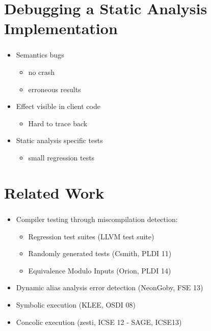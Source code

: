 \documentclass[mathserif,10pt]{beamer}
\begin{document}
\section{Debugging a Static Analysis Implementation}
\frame
{
  \frametitle{\secname}
  \begin{itemize} [<+->]
    \item Semantics bugs
    \begin{itemize}
      \item no crash
      \item erroneous results
    \end{itemize} 
    \vspace{1cm}
    \item Effect visible in client code
    \begin{itemize}
      \item Hard to trace back
    \end{itemize} 
    \vspace{1cm}
    \item Static analysis specific tests
    \begin{itemize}
      \item small regression tests
    \end{itemize} 
  \end{itemize} 
}

\section{Related Work}
\frame
{
  \frametitle{\secname}
  \begin{itemize} [<+->]
    \item Compiler testing through miscompilation detection:
    \begin{itemize}
      \item Regression test suites (LLVM test suite)
      \item Randomly generated tests (Csmith, PLDI 11)
      \item Equivalence Modulo Inputs (Orion, PLDI 14)
    \end{itemize} 
    \vspace{1cm}
    \item Dynamic alias analysis error detection (NeonGoby, FSE 13)

    \vspace{1cm}
    \item Symbolic execution (KLEE, OSDI 08) 
    \item Concolic execution (zesti, ICSE 12 - SAGE, ICSE13)
  \end{itemize} 
}
\end{document}
